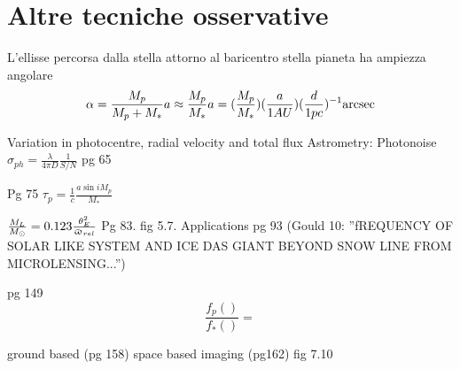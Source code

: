\section{Altre tecniche osservative}
\begin{workout}[Astrometry]
L'ellisse percorsa dalla stella attorno al baricentro stella pianeta ha ampiezza angolare
\begin{equation}
\alpha=\frac{M_p}{M_p+M_*}a\approx\frac{M_p}{M_*}a=(\frac{M_p}{M_*})(\frac{a}{1AU})(\frac{d}{1pc})\expy{-1}\si{\arcsec}
\end{equation}

Variation in photocentre, radial velocity and total flux
Astrometry: Photonoise $\sigma_{ph}=\frac{\lambda}{4\pi D}\frac{1}{S/N}$
pg 65

\end{workout}

\begin{workout}
Pg 75
$\tau_p=\frac{1}{c}\frac{a\sin{i}M_p}{M_*}$
\end{workout}

\begin{workout}[Microlensing]
$\frac{M_L}{\msun{}}=0.123\frac{\theta_E^2}{\upvarpi_{rel}}$
Pg 83. fig 5.7. Applications pg 93
(Gould 10: ''fREQUENCY OF SOLAR LIKE SYSTEM AND ICE DAS GIANT BEYOND SNOW LINE FROM MICROLENSING...'')
\end{workout}

\begin{workout}
pg 149
\begin{equation*}
\frac{f_p()}{f_*()}=
\end{equation*}
\end{workout}
\begin{workout}
ground based (pg 158) space based imaging (pg162)
fig 7.10
\end{workout}